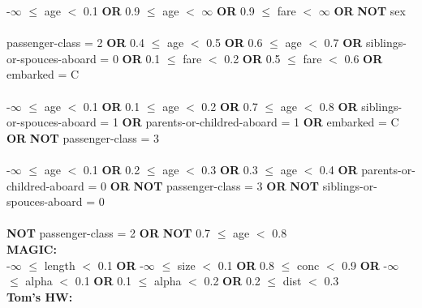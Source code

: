 \noindent -$\infty$ $\le$ age $<$ 0.1 \textbf{OR} 0.9 $\le$ age $<$ $\infty$ \textbf{OR} 0.9 $\le$ fare $<$ $\infty$ \textbf{OR}  \textbf{NOT} sex \\\\passenger-class = 2 \textbf{OR} 0.4 $\le$ age $<$ 0.5 \textbf{OR} 0.6 $\le$ age $<$ 0.7 \textbf{OR} siblings-or-spouces-aboard = 0 \textbf{OR} 0.1 $\le$ fare $<$ 0.2 \textbf{OR} 0.5 $\le$ fare $<$ 0.6 \textbf{OR} embarked = C \\\\-$\infty$ $\le$ age $<$ 0.1 \textbf{OR} 0.1 $\le$ age $<$ 0.2 \textbf{OR} 0.7 $\le$ age $<$ 0.8 \textbf{OR} siblings-or-spouces-aboard = 1 \textbf{OR} parents-or-childred-aboard = 1 \textbf{OR} embarked = C \textbf{OR}  \textbf{NOT} passenger-class = 3 \\\\-$\infty$ $\le$ age $<$ 0.1 \textbf{OR} 0.2 $\le$ age $<$ 0.3 \textbf{OR} 0.3 $\le$ age $<$ 0.4 \textbf{OR} parents-or-childred-aboard = 0 \textbf{OR}  \textbf{NOT} passenger-class = 3 \textbf{OR}  \textbf{NOT} siblings-or-spouces-aboard = 0 \\\\ \textbf{NOT} passenger-class = 2 \textbf{OR}  \textbf{NOT} 0.7 $\le$ age $<$ 0.8 \\

\noindent \textbf{ MAGIC: }\\

\noindent -$\infty$ $\le$ length $<$ 0.1 \textbf{OR} -$\infty$ $\le$ size $<$ 0.1 \textbf{OR} 0.8 $\le$ conc $<$ 0.9 \textbf{OR} -$\infty$ $\le$ alpha $<$ 0.1 \textbf{OR} 0.1 $\le$ alpha $<$ 0.2 \textbf{OR} 0.2 $\le$ dist $<$ 0.3 \\

\noindent \textbf{ Tom's HW: }\\

